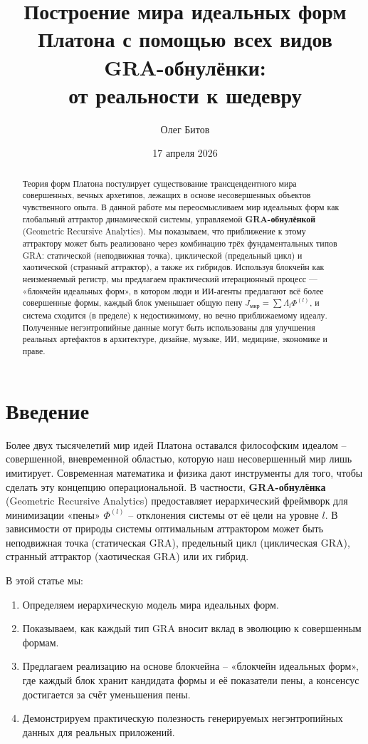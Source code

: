 \documentclass[12pt,a4paper]{article}
\title{Построение мира идеальных форм Платона с помощью всех видов GRA-обнулёнки: \\ от реальности к шедевру}
\author{Олег Битов}
\date{17 апреля 2026}
\begin{document}
\maketitle

\begin{abstract}
Теория форм Платона постулирует существование трансцендентного мира совершенных, вечных архетипов, лежащих в основе несовершенных объектов чувственного опыта. В данной работе мы переосмысливаем мир идеальных форм как глобальный аттрактор динамической системы, управляемой \textbf{GRA-обнулёнкой} (Geometric Recursive Analytics). Мы показываем, что приближение к этому аттрактору может быть реализовано через комбинацию трёх фундаментальных типов GRA: статической (неподвижная точка), циклической (предельный цикл) и хаотической (странный аттрактор), а также их гибридов. Используя блокчейн как неизменяемый регистр, мы предлагаем практический итерационный процесс — «блокчейн идеальных форм», в котором люди и ИИ-агенты предлагают всё более совершенные формы, каждый блок уменьшает общую пену \(J_{\text{мир}} = \sum \Lambda_l \Phi^{(l)}\), и система сходится (в пределе) к недостижимому, но вечно приближаемому идеалу. Полученные негэнтропийные данные могут быть использованы для улучшения реальных артефактов в архитектуре, дизайне, музыке, ИИ, медицине, экономике и праве.
\end{abstract}

\section{Введение}

Более двух тысячелетий мир идей Платона оставался философским идеалом – совершенной, вневременной областью, которую наш несовершенный мир лишь имитирует. Современная математика и физика дают инструменты для того, чтобы сделать эту концепцию операциональной. В частности, \textbf{GRA-обнулёнка} (Geometric Recursive Analytics) предоставляет иерархический фреймворк для минимизации «пены» \(\Phi^{(l)}\) – отклонения системы от её цели на уровне \(l\). В зависимости от природы системы оптимальным аттрактором может быть неподвижная точка (статическая GRA), предельный цикл (циклическая GRA), странный аттрактор (хаотическая GRA) или их гибрид.

В этой статье мы:
\begin{enumerate}
    \item Определяем иерархическую модель мира идеальных форм.
    \item Показываем, как каждый тип GRA вносит вклад в эволюцию к совершенным формам.
    \item Предлагаем реализацию на основе блокчейна – «блокчейн идеальных форм», где каждый блок хранит кандидата формы и её показатели пены, а консенсус достигается за счёт уменьшения пены.
    \item Демонстрируем практическую полезность генерируемых негэнтропийных данных для реальных приложений.
\end{enumerate}
\end{document}
